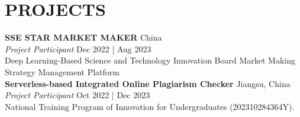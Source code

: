 \section*{PROJECTS}
\noindent
\textbf{\textsc{SSE STAR MARKET MAKER}} \hfill China\\ %
\textit{Project Participant}
   \hfill Dec 2022 | Aug 2023 \\%
Deep Learning-Based Science and Technology Innovation Board Market Making Strategy Management Platform\\


\noindent
\textbf{Serverless-based Integrated Online Plagiarism Checker} \hfill Jiangsu, China\\ %
\textit{Project Participant}
   \hfill Oct 2022 | Dec 2023 \\%
National Training Program of Innovation for Undergraduates (202310284364Y).